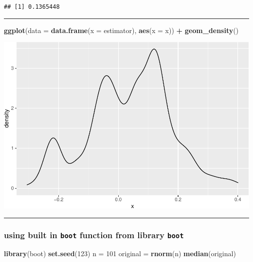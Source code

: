\documentclass[]{article}
\newenvironment{Shaded}{\begin{snugshade}}{\end{snugshade}}
\newcommand{\DataTypeTok}[1]{\textcolor[rgb]{0.13,0.29,0.53}{#1}}
\newcommand{\DecValTok}[1]{\textcolor[rgb]{0.00,0.00,0.81}{#1}}
\newcommand{\KeywordTok}[1]{\textcolor[rgb]{0.13,0.29,0.53}{\textbf{#1}}}
\newcommand{\NormalTok}[1]{#1}
\newcommand{\OperatorTok}[1]{\textcolor[rgb]{0.81,0.36,0.00}{\textbf{#1}}}
\newcommand{\StringTok}[1]{\textcolor[rgb]{0.31,0.60,0.02}{#1}}
\begin{document}
\begin{verbatim}
## [1] 0.1365448
\end{verbatim}

\begin{center}\rule{0.5\linewidth}{\linethickness}\end{center}

\begin{Shaded}
\begin{Highlighting}[]
\KeywordTok{ggplot}\NormalTok{(}\DataTypeTok{data =} \KeywordTok{data.frame}\NormalTok{(}\DataTypeTok{x =}\NormalTok{ estimator), }\KeywordTok{aes}\NormalTok{(}\DataTypeTok{x =}\NormalTok{ x)) }\OperatorTok{+}\StringTok{ }\KeywordTok{geom_density}\NormalTok{()}
\end{Highlighting}
\end{Shaded}

\includegraphics{5Resample_files/figure-latex/unnamed-chunk-13-1.pdf}

\begin{center}\rule{0.5\linewidth}{\linethickness}\end{center}

\hypertarget{using-built-in-boot-function-from-library-boot}{%
\subsubsection{\texorpdfstring{using built in \texttt{boot} function
from library
\texttt{boot}}{using built in boot function from library boot}}\label{using-built-in-boot-function-from-library-boot}}

\begin{Shaded}
\begin{Highlighting}[]
\KeywordTok{library}\NormalTok{(boot)}
\KeywordTok{set.seed}\NormalTok{(}\DecValTok{123}\NormalTok{)}
\NormalTok{n =}\StringTok{ }\DecValTok{101}
\NormalTok{original =}\StringTok{ }\KeywordTok{rnorm}\NormalTok{(n)}
\KeywordTok{median}\NormalTok{(original)}
\end{Highlighting}
\end{Shaded}
\end{document}
